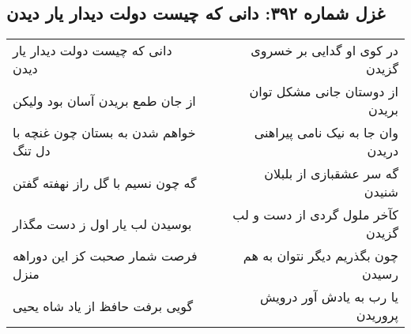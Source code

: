 \begin{center}
\section*{غزل شماره ۳۹۲: دانی که چیست دولت دیدار یار دیدن}
\label{sec:sh392}
\begin{longtable}{l p{0.5cm} r}
دانی که چیست دولت دیدار یار دیدن
&&
در کوی او گدایی بر خسروی گزیدن
\\
از جان طمع بریدن آسان بود ولیکن
&&
از دوستان جانی مشکل توان بریدن
\\
خواهم شدن به بستان چون غنچه با دل تنگ
&&
وان جا به نیک نامی پیراهنی دریدن
\\
گه چون نسیم با گل راز نهفته گفتن
&&
گه سر عشقبازی از بلبلان شنیدن
\\
بوسیدن لب یار اول ز دست مگذار
&&
کآخر ملول گردی از دست و لب گزیدن
\\
فرصت شمار صحبت کز این دوراهه منزل
&&
چون بگذریم دیگر نتوان به هم رسیدن
\\
گویی برفت حافظ از یاد شاه یحیی
&&
یا رب به یادش آور درویش پروریدن
\\
\end{longtable}
\end{center}
